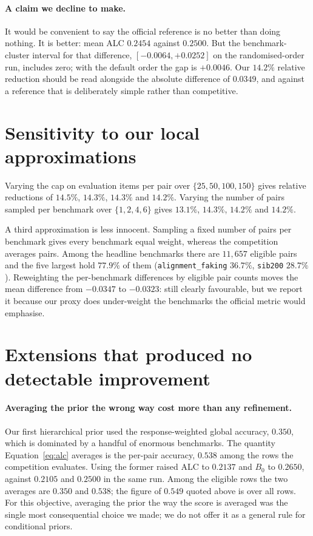 \documentclass{article}
\begin{document}
\paragraph{A claim we decline to make.} It would be convenient to say the official
reference is no better than doing nothing. It is better: mean ALC $0.2454$ against
$0.2500$. But the benchmark-cluster interval for that difference,
$[-0.0064,+0.0252]$ on the randomised-order run, includes zero; with the default
order the gap is $+0.0046$. Our $14.2\%$ relative reduction should be read
alongside the absolute difference of $0.0349$, and against a reference that is
deliberately simple rather than competitive.

\section{Sensitivity to our local approximations}
\label{sec:sens}

Varying the cap on evaluation items per pair over $\{25,50,100,150\}$ gives
relative reductions of $14.5\%$, $14.3\%$, $14.3\%$ and $14.2\%$. Varying the
number of pairs sampled per benchmark over $\{1,2,4,6\}$ gives $13.1\%$, $14.3\%$,
$14.2\%$ and $14.2\%$.

A third approximation is less innocent. Sampling a fixed number of pairs per
benchmark gives every benchmark equal weight, whereas the competition averages
pairs. Among the headline benchmarks there are $11{,}657$ eligible pairs and the
five largest hold $77.9\%$ of them (\texttt{alignment\_faking} $36.7\%$,
\texttt{sib200} $28.7\%$). Reweighting the per-benchmark differences by eligible
pair counts moves the mean difference from $-0.0347$ to $-0.0323$: still clearly
favourable, but we report it because our proxy does under-weight the benchmarks
the official metric would emphasise.

\section{Extensions that produced no detectable improvement}
\label{sec:negativos}

\paragraph{Averaging the prior the wrong way cost more than any refinement.}
Our first hierarchical prior used the response-weighted global accuracy, $0.350$,
which is dominated by a handful of enormous benchmarks. The quantity
Equation~\eqref{eq:alc} averages is the per-pair accuracy, $0.538$ among the rows
the competition evaluates. Using the
former raised ALC to $0.2137$ and $B_0$ to $0.2650$, against $0.2105$ and
$0.2500$ in the same run. Among the eligible rows the two averages are $0.350$ and $0.538$; the figure of
$0.549$ quoted above is over all rows. For this objective, averaging the prior the way the
score is averaged was the single most consequential choice we made; we do not
offer it as a general rule for conditional priors.
\end{document}
